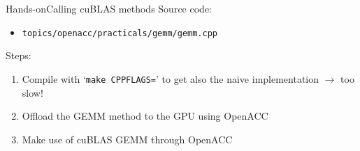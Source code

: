 \documentclass[12pt,aspectratio=169]{beamer}
\newcommand\shinline[2][]{\lstinline[style=shstyle,basicstyle=\ttfamily,#1]!#2!}
\begin{document}
\begin{frame}[fragile]{Hands-on}{Calling cuBLAS methods}
  Source code:
  \begin{itemize}
  \item \shinline{topics/openacc/practicals/gemm/gemm.cpp}
  \end{itemize}
  \vfill
  Steps:
  \begin{enumerate}
  \item Compile with `\shinline{make CPPFLAGS=}' to get also the naive implementation $\rightarrow$ too slow!
  \item Offload the GEMM method to the GPU using OpenACC
  \item Make use of cuBLAS GEMM through OpenACC
  \end{enumerate}
\end{frame}




\end{document}
